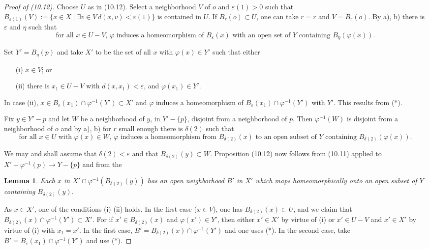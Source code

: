 \documentclass[12pt,a4paper]{article}
\theoremstyle{plain}
\newtheorem{lemma}[theorem]{Lemma}
\theoremstyle{definition}
\theoremstyle{remark}
\begin{document}
\begin{proof}[Proof of (10.12)]
Choose $U$ as in (10.12). Select a neighborhood $V$ of $o$ and $\varepsilon(1) > 0$ such that $B_{\varepsilon(1)}(V) := \{x \in X \mid \exists v \in V \, d(x, v) < \varepsilon(1)\}$ is contained in $U$. If $B_r(o) \subset U$, one can take $r = r$ and $V = B_r(o)$. By a), b) there is $\varepsilon$ and $\eta$ such that
\begin{equation*}
\tag{*} \text{for all } x \in U - V, \, \varphi \text{ induces a homeomorphism of } B_\varepsilon(x) \text{ with an open set of } Y \text{ containing } B_\eta(\varphi(x)).
\end{equation*}

Set $Y' = B_\eta(p)$ and take $X'$ to be the set of all $x$ with $\varphi(x) \in Y'$ such that either
\begin{enumerate}
\item[(i)] $x \in V$; or
\item[(ii)] there is $x_1 \in U - V$ with $d(x, x_1) < \varepsilon$, and $\varphi(x_1) \in Y'$.
\end{enumerate}

In case (ii), $x \in B_\varepsilon(x_1) \cap \varphi^{-1}(Y') \subset X'$ and $\varphi$ induces a homeomorphism of $B_\varepsilon(x_1) \cap \varphi^{-1}(Y')$ with $Y'$. This results from (*).

Fix $y \in Y' - p$ and let $W$ be a neighborhood of $y$, in $Y' - \{p\}$, disjoint from a neighborhood of $p$. Then $\varphi^{-1}(W)$ is disjoint from a neighborhood of $o$ and by a), b) for $r$ small enough there is $\delta(2)$ such that
\begin{equation*}
\tag{**} \text{for all } x \in U \text{ with } \varphi(x) \in W, \, \varphi \text{ induces a homeomorphism from } B_{\delta(2)}(x) \text{ to an open subset of } Y \text{ containing } B_{\delta(2)}(\varphi(x)).
\end{equation*}

We may and shall assume that $\delta(2) < \varepsilon$ and that $B_{\delta(2)}(y) \subset W$. Proposition (10.12) now follows from (10.11) applied to $X' - \varphi^{-1}(p) \to Y - \{p\}$ and from the

\begin{lemma}
\label{10.12.1}
Each $x$ in $X' \cap \varphi^{-1}(B_{\delta(2)}(y))$ has an open neighborhood $B'$ in $X'$ which maps homeomorphically onto an open subset of $Y$ containing $B_{\delta(2)}(y)$.
\end{lemma}

As $x \in X'$, one of the conditions (i) (ii) holds. In the first case ($x \in V$), one has $B_{\delta(2)}(x) \subset U$, and we claim that $B_{\delta(2)}(x) \cap \varphi^{-1}(Y') \subset X'$. For if $x' \in B_{\delta(2)}(x)$ and $\varphi(x') \in Y'$, then either $x' \in X'$ by virtue of (i) or $x' \in U - V$ and $x' \in X'$ by virtue of (i) with $x_1 = x'$. In the first case, $B' = B_{\delta(2)}(x) \cap \varphi^{-1}(Y')$ and one uses (*). In the second case, take $B' = B_\varepsilon(x_1) \cap \varphi^{-1}(Y')$ and use (*).
\end{proof}
\end{document}
